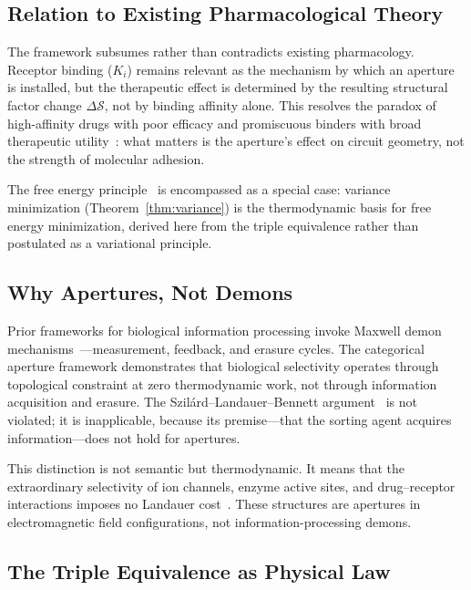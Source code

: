 \documentclass[twocolumn,10pt]{article}
\theoremstyle{remark}
\begin{document}
\subsection{Relation to Existing Pharmacological Theory}

The framework subsumes rather than contradicts existing pharmacology. Receptor binding ($K_i$) remains relevant as the mechanism by which an aperture is installed, but the therapeutic effect is determined by the resulting structural factor change $\Delta\mathcal{S}$, not by binding affinity alone. This resolves the paradox of high-affinity drugs with poor efficacy and promiscuous binders with broad therapeutic utility~\citep{roth2004multiplicity}: what matters is the aperture's effect on circuit geometry, not the strength of molecular adhesion.

The free energy principle~\citep{friston2010free} is encompassed as a special case: variance minimization (Theorem~\ref{thm:variance}) is the thermodynamic basis for free energy minimization, derived here from the triple equivalence rather than postulated as a variational principle.

\subsection{Why Apertures, Not Demons}

Prior frameworks for biological information processing invoke Maxwell demon mechanisms~\citep{sagawa2010generalized}---measurement, feedback, and erasure cycles. The categorical aperture framework demonstrates that biological selectivity operates through topological constraint at zero thermodynamic work, not through information acquisition and erasure. The Szil\'ard--Landauer--Bennett argument~\citep{szilard1929entropieverminderung,landauer1961irreversibility,bennett1982thermodynamics} is not violated; it is inapplicable, because its premise---that the sorting agent acquires information---does not hold for apertures.

This distinction is not semantic but thermodynamic. It means that the extraordinary selectivity of ion channels, enzyme active sites, and drug--receptor interactions imposes no Landauer cost~\citep{doyle1998structure,hille2001ion}. These structures are apertures in electromagnetic field configurations, not information-processing demons.

\subsection{The Triple Equivalence as Physical Law}
\end{document}
